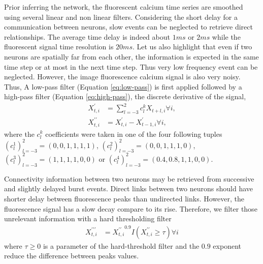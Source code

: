 \documentclass[wcp]{jmlr}
\begin{document}
Prior inferring the network, the fluorescent calcium time series
are smoothed using several linear and non linear filters.
Considering the short delay for a communication between neurons, slow events
can be neglected to retrieve direct relationships. The average time
delay is indeed about $1ms$ or $2ms$ while the fluorescent signal time
resolution is $20ms$. Let us also highlight that even if two neurons are
spatially far from each other, the information is expected in the same time
step or at most in the next time step. Thus very low frequency event can be neglected.
However, the image fluorescence calcium signal is also very noisy. Thus,
A low-pass filter (Equation \ref{eq:low-pass}) is first applied followed by a
high-pass filter (Equation \ref{eq:high-pass}), the discrete derivative of
the signal,
\begin{align}
X^\prime_{t,i} &= \sum_{l=-3}^2 c_l^k X_{t+l,i} \forall i, \label{eq:low-pass}\\
X^{\prime\prime}_{t,i} &= X^{\prime}_{t,i} - X^{\prime}_{t-1,i} \forall i, \label{eq:high-pass}
\end{align}
where the $c_l^k$ coefficients were taken in one of the four
following tuples
$\left(c_l^1\right)_{l=-3}^2=(0, 0, 1, 1, 1, 1)$,
$\left(c_l^2\right)_{l=-3}^2=(0, 0, 1, 1, 1, 0)$,
$\left(c_l^3\right)_{l=-3}^2=(1, 1, 1, 1, 0, 0)$ or
$\left(c_l^4\right)_{l=-3}^2=(0.4, 0.8, 1, 1, 0, 0)$.

Connectivity information between two neurons may be retrieved from successive
and slightly delayed burst events. Direct links
between two neurons should have shorter delay between fluorescence
peaks than undirected links. However, the fluorescence signal has a slow
decay compare to its rise. Therefore, we filter those unrelevant information
with a hard thresholding filter
\begin{align}
X^{\prime\prime\prime}_{t,i} &=
{X^{\prime\prime}_{t,i}}^{0.9} I(X^{\prime\prime}_{t,i} \geq \tau) \forall i
\label{eq:hard-treshold-filter}
\end{align}
where $\tau \geq 0$ is a parameter of the hard-threshold filter and the $0.9$
exponent reduce the difference between peaks values.
\end{document}
